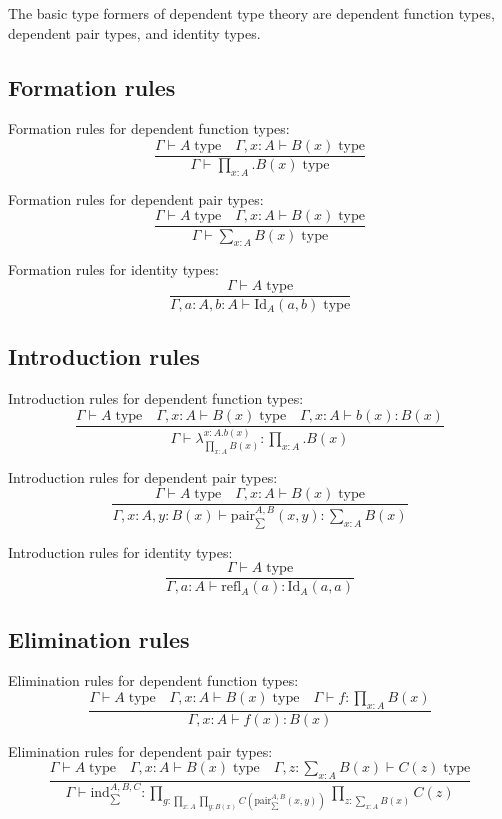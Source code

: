\documentclass{book}
\begin{document}
The basic type formers of dependent type theory are dependent function types, dependent pair types, and identity types.

\subsection{Formation rules}

Formation rules for dependent function types:
$$\frac{\Gamma \vdash A \; \mathrm{type} \quad \Gamma, x:A \vdash B(x) \; \mathrm{type}}{\Gamma \vdash \prod_{x:A}.B(x) \; \mathrm{type}}$$

Formation rules for dependent pair types:
$$\frac{\Gamma \vdash A \; \mathrm{type} \quad \Gamma, x:A \vdash B(x) \; \mathrm{type}}{\Gamma \vdash \sum_{x:A} B(x) \; \mathrm{type}}$$

Formation rules for identity types:
$$\frac{\Gamma \vdash A \; \mathrm{type}}{\Gamma, a:A, b:A \vdash \mathrm{Id}_A(a, b) \; \mathrm{type}}$$

\subsection{Introduction rules}

Introduction rules for dependent function types:
$$\frac{\Gamma \vdash A \; \mathrm{type} \quad \Gamma, x:A \vdash B(x) \; \mathrm{type} \quad \Gamma, x:A \vdash b(x):B(x)}{\Gamma \vdash \lambda_{\prod_{x:A} B(x)}^{x:A.b(x)}:\prod_{x:A}.B(x)}$$

Introduction rules for dependent pair types:
$$\frac{\Gamma \vdash A \; \mathrm{type} \quad \Gamma, x:A \vdash B(x) \; \mathrm{type}}{\Gamma, x:A, y:B(x) \vdash \mathrm{pair}_{\sum}^{A, B}(x, y):\sum_{x:A} B(x)}$$

Introduction rules for identity types:
$$\frac{\Gamma \vdash A \; \mathrm{type}}{\Gamma, a:A \vdash \mathrm{refl}_A(a):\mathrm{Id}_A(a, a)}$$

\subsection{Elimination rules}

Elimination rules for dependent function types:
$$\frac{\Gamma \vdash A \; \mathrm{type} \quad \Gamma, x:A \vdash B(x) \; \mathrm{type} \quad \Gamma \vdash f:\prod_{x:A} B(x)}{\Gamma, x:A \vdash f(x):B(x)}$$

Elimination rules for dependent pair types:
$$\frac{\Gamma \vdash A \; \mathrm{type} \quad \Gamma, x:A \vdash B(x) \; \mathrm{type} \quad \Gamma, z:\sum_{x:A} B(x) \vdash C(z) \; \mathrm{type}}{\Gamma \vdash \mathrm{ind}_{\sum}^{A, B, C}:\prod_{g:\prod_{x:A} \prod_{y:B(x)} C(\mathrm{pair}_{\sum}^{A, B}(x, y))} \prod_{z:\sum_{x:A} B(x)} C(z)}$$
\end{document}
